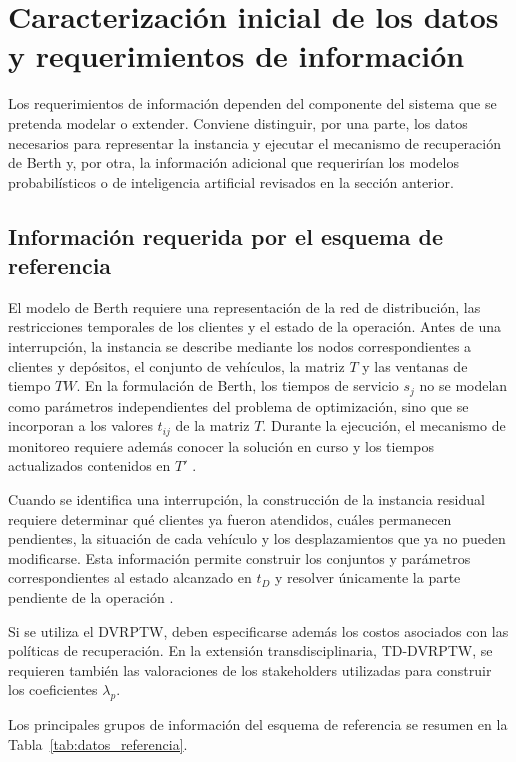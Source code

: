 \documentclass[11pt]{article}
\begin{document}
\FloatBarrier

\section{Caracterización inicial de los datos y requerimientos de información}

Los requerimientos de información dependen del componente del sistema que se pretenda
modelar o extender. Conviene distinguir, por una parte, los datos necesarios para
representar la instancia y ejecutar el mecanismo de recuperación de Berth y, por otra,
la información adicional que requerirían los modelos probabilísticos o de inteligencia
artificial revisados en la sección anterior.

\subsection{Información requerida por el esquema de referencia}

El modelo de Berth requiere una representación de la red de distribución, las
restricciones temporales de los clientes y el estado de la operación. Antes de una
interrupción, la instancia se describe mediante los nodos correspondientes a clientes
y depósitos, el conjunto de vehículos, la matriz \(T\) y las ventanas de tiempo
\(TW\). En la formulación de Berth, los tiempos de servicio \(s_j\) no se modelan como
parámetros independientes del problema de optimización, sino que se incorporan a
los valores \(t_{ij}\) de la matriz \(T\). Durante la ejecución, el mecanismo de monitoreo requiere además conocer la solución en curso y los tiempos actualizados contenidos
en \(T'\) \parencite{berth_thesis_2025}.

Cuando se identifica una interrupción, la construcción de la instancia residual requiere
determinar qué clientes ya fueron atendidos, cuáles permanecen pendientes, la situación
de cada vehículo y los desplazamientos que ya no pueden modificarse. Esta información
permite construir los conjuntos y parámetros correspondientes al estado alcanzado en
\(t_D\) y resolver únicamente la parte pendiente de la operación
\parencite{berth_thesis_2025}.

Si se utiliza el DVRPTW, deben especificarse además los costos asociados con las
políticas de recuperación. En la extensión transdisciplinaria, TD-DVRPTW, se requieren
también las valoraciones de los stakeholders utilizadas para construir los coeficientes
\(\lambda_p\).

Los principales grupos de información del esquema de referencia se resumen en la
Tabla~\ref{tab:datos_referencia}.
\end{document}
